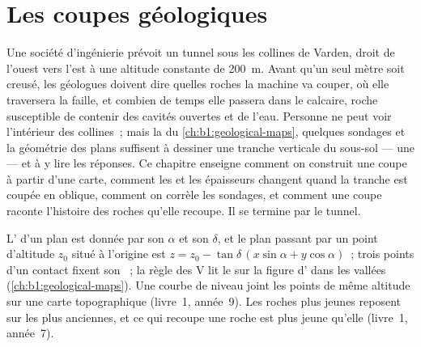 \chapter{Les coupes géologiques}\label{ch:b1:cross-sections}

Une société d'ingénierie prévoit un tunnel sous les collines de Varden, droit de
l'ouest vers l'est à une altitude constante de \qty{200}{m}. Avant qu'un seul
mètre soit creusé, les géologues doivent dire quelles roches la machine va
couper, où elle traversera la faille, et combien de temps elle passera dans le
calcaire, roche susceptible de contenir des cavités ouvertes et de l'eau.
Personne ne peut voir l'intérieur des collines~; mais la  du
\cref{ch:b1:geological-maps}, quelques sondages et la géométrie des plans
suffisent à dessiner une tranche verticale du sous-sol --- une  --- et à y lire les réponses. Ce chapitre enseigne comment on
construit une coupe à partir d'une carte, comment les  et les épaisseurs
changent quand la tranche est coupée en oblique, comment on corrèle les
sondages, et comment une coupe raconte l'histoire des roches qu'elle recoupe. Il
se termine par le tunnel.

\begin{recall}
L' d'un plan est donnée par son  $\alpha$ et son 
$\delta$, et le plan passant par un point d'altitude $z_0$ situé à l'origine est
$z = z_0 - \tan\delta\,(x\sin\alpha + y\cos\alpha)$~; trois points d'un contact
fixent son ~; la règle des V lit le  sur la figure d'
dans les vallées (\cref{ch:b1:geological-maps}). Une courbe de niveau joint les
points de même altitude sur une carte topographique (livre~1, année~9). Les
roches plus jeunes reposent sur les plus anciennes, et ce qui recoupe une roche
est plus jeune qu'elle (livre~1, année~7).
\end{recall}

